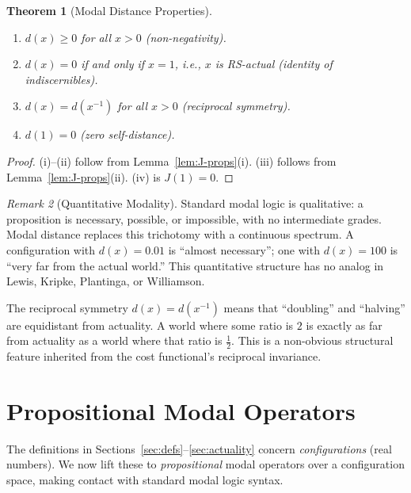 \documentclass[12pt,a4paper]{article}
\newtheorem{theorem}{Theorem}[section]
\theoremstyle{definition}
\theoremstyle{remark}
\newtheorem{remark}[theorem]{Remark}
\begin{document}
\begin{theorem}[Modal Distance Properties]
\label{thm:distance}
\begin{enumerate}[label=(\roman*)]
  \item $d(x) \geq 0$ for all $x > 0$ (non-negativity).
  \item $d(x) = 0$ if and only if $x = 1$, i.e., $x$ is RS-actual
  (identity of indiscernibles).
  \item $d(x) = d(x^{-1})$ for all $x > 0$ (reciprocal symmetry).
  \item $d(1) = 0$ (zero self-distance).
\end{enumerate}
\end{theorem}

\begin{proof}
(i)--(ii) follow from Lemma~\ref{lem:J-props}(i).
(iii) follows from Lemma~\ref{lem:J-props}(ii).
(iv) is $J(1) = 0$.
\end{proof}

\begin{remark}[Quantitative Modality]
Standard modal logic is qualitative: a proposition is necessary,
possible, or impossible, with no intermediate grades.  Modal distance
replaces this trichotomy with a continuous spectrum.  A configuration
with $d(x) = 0.01$ is ``almost necessary''; one with $d(x) = 100$ is
``very far from the actual world.''  This quantitative structure has no
analog in Lewis, Kripke, Plantinga, or Williamson.

The reciprocal symmetry $d(x) = d(x^{-1})$ means that ``doubling'' and
``halving'' are equidistant from actuality.  A world where some ratio is
$2$ is exactly as far from actuality as a world where that ratio is
$\tfrac{1}{2}$.  This is a non-obvious structural feature inherited from
the cost functional's reciprocal invariance.
\end{remark}

\section{Propositional Modal Operators}
\label{sec:operators}

The definitions in Sections~\ref{sec:defs}--\ref{sec:actuality}
concern \emph{configurations} (real numbers).  We now lift these to
\emph{propositional} modal operators over a configuration space, making
contact with standard modal logic syntax.
\end{document}
